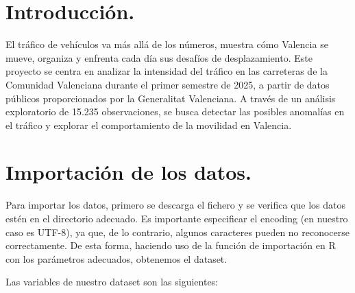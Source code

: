 \documentclass[notspecified,article,submit,moreauthors,pdftex]{Definitions/mdpi}
\begin{document}

\section{Introducción.}\label{introducciuxf3n.}

El tráfico de vehículos va más allá de los números, muestra cómo
Valencia se mueve, organiza y enfrenta cada día sus desafíos de
desplazamiento. Este proyecto se centra en analizar la intensidad del
tráfico en las carreteras de la Comunidad Valenciana durante el primer
semestre de 2025, a partir de datos públicos proporcionados por la
Generalitat Valenciana. A través de un análisis exploratorio de 15.235
observaciones, se busca detectar las posibles anomalías en el tráfico y
explorar el comportamiento de la movilidad en Valencia.

\section{Importación de los datos.}\label{importaciuxf3n-de-los-datos.}

Para importar los datos, primero se descarga el fichero y se verifica
que los datos estén en el directorio adecuado. Es importante especificar
el encoding (en nuestro caso es UTF-8), ya que, de lo contrario, algunos
caracteres pueden no reconocerse correctamente. De esta forma, haciendo
uso de la función de importación en R con los parámetros adecuados,
obtenemos el dataset.

Las variables de nuestro dataset son las siguientes:
\end{document}
